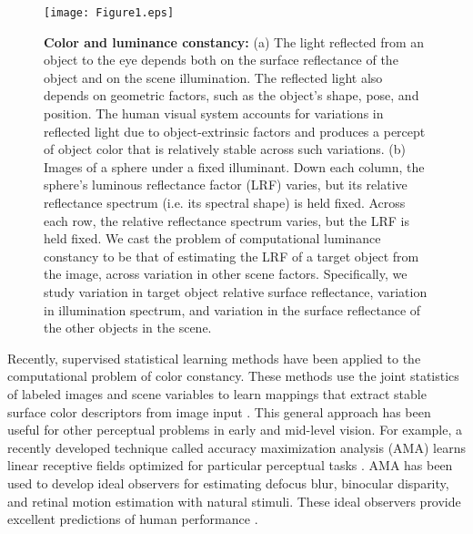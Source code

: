 \documentclass{jov}
\providecommand{\DIFaddbeginFL}{} %
\providecommand{\DIFaddendFL}{} %
\providecommand{\DIFdelbeginFL}{} %
\providecommand{\DIFdelendFL}{} %
\newcommand{\DIFscaledelfig}{0.5}
\newlength{\DIFdelgraphicswidth} %
\newlength{\DIFdelgraphicsheight} %
\newcommand{\DIFaddincludegraphics}[2][]{{\color{blue}\fbox{\DIFOincludegraphics[#1]{#2}}}} %
\newcommand{\DIFdelincludegraphics}[2][]{%
\sbox{\DIFdelgraphicsbox}{\DIFOincludegraphics[#1]{#2}}%
\settoboxwidth{\DIFdelgraphicswidth}{\DIFdelgraphicsbox} %
\settoboxtotalheight{\DIFdelgraphicsheight}{\DIFdelgraphicsbox} %
\scalebox{\DIFscaledelfig}{%
\parbox[b]{\DIFdelgraphicswidth}{\usebox{\DIFdelgraphicsbox}\\[-\baselineskip] \rule{\DIFdelgraphicswidth}{0em}}\llap{\resizebox{\DIFdelgraphicswidth}{\DIFdelgraphicsheight}{%
\setlength{\unitlength}{\DIFdelgraphicswidth}%
\begin{picture}(1,1)%
\thicklines\linethickness{2pt} %
{\color[rgb]{1,0,0}\put(0,0){\framebox(1,1){}}}%
{\color[rgb]{1,0,0}\put(0,0){\line( 1,1){1}}}%
{\color[rgb]{1,0,0}\put(0,1){\line(1,-1){1}}}%
\end{picture}%
}\hspace*{3pt}}} %
} %
\DeclareRobustCommand{\DIFaddbeginFL}{\DIFOaddbeginFL \let\includegraphics\DIFaddincludegraphics} %
\DeclareRobustCommand{\DIFaddendFL}{\DIFOaddendFL \let\includegraphics\DIFOincludegraphics} %
\DeclareRobustCommand{\DIFdelbeginFL}{\DIFOdelbeginFL \let\includegraphics\DIFdelincludegraphics} %
\DeclareRobustCommand{\DIFdelendFL}{\DIFOaddendFL \let\includegraphics\DIFOincludegraphics} %
\begin{document}
\begin{figure}
\centering
\DIFdelbeginFL %
{%
}
{%
}    
\DIFdelendFL \DIFaddbeginFL \texttt{[image: Figure1.eps]}    
    \DIFaddendFL \caption{{\bf Color and luminance constancy:} (a)  The light reflected from an object to the eye depends both on the surface reflectance of the object and on the scene illumination. 
The reflected light also depends on geometric factors, such as the object's shape, pose, and position. 
The human visual system accounts for variations in reflected light due to object-extrinsic factors and produces a percept of object color that is relatively stable across such variations. 
(b) Images of a sphere under a fixed illuminant.  
Down each column, the sphere's luminous reflectance factor (LRF) varies, but its relative reflectance spectrum (i.e. its spectral shape) is held fixed.
Across each row, the relative reflectance spectrum varies, but the LRF is held fixed.
We cast the problem of computational luminance constancy to be that of estimating the LRF of a target object from the image, across variation in other scene factors. 
Specifically, we study variation in target object relative surface reflectance, variation in illumination spectrum, and variation in the surface reflectance of the other objects in the scene.}
\DIFaddbeginFL \label{fig:introFigure}
 \DIFaddendFL \end{figure}

Recently, supervised statistical learning methods have been applied to the computational problem of color constancy.
These methods use the joint statistics of labeled images and scene variables to learn mappings that extract stable surface color descriptors from image input \cite{barron2015convolutional}.
This general approach has been useful for other perceptual problems in early and mid-level vision.
For example, a recently developed technique called accuracy maximization analysis (AMA) learns linear receptive fields optimized for particular perceptual tasks \cite{geisler2009optimal,burge2017accuracy,jaini2017linking}. AMA has been used to develop ideal observers for estimating defocus blur, binocular disparity, and retinal motion estimation with natural stimuli. These ideal observers provide excellent predictions of human performance \cite{burge2011optimal, burge2012optimal, burge2014optimal, burge2015optimal}.
\end{document}
